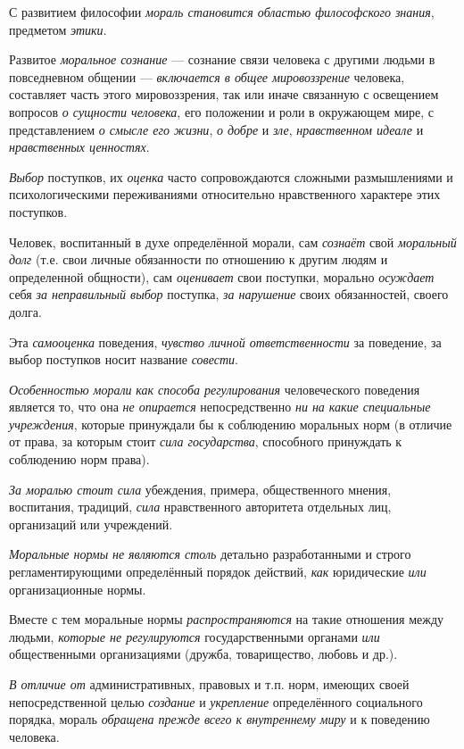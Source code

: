 \documentclass[a4paper,14pt,russian]{extreport}
\begin{document}
С развитием философии \emph{мораль становится областью философского знания}, предметом \emph{этики}.

Развитое \emph{моральное сознание} --- сознание связи человека с другими людьми в повседневном общении --- \emph{включается в общее мировоззрение} человека, составляет часть этого мировоззрения, так или иначе связанную с освещением вопросов \emph{о сущности человека}, его положении и роли в окружающем мире, с представлением \emph{о смысле его жизни}, \emph{о добре} и \emph{зле}, \emph{нравственном идеале} и \emph{нравственных ценностях}.

\emph{Выбор} поступков, их \emph{оценка} часто сопровождаются сложными размышлениями и психологическими переживаниями относительно нравственного характере этих поступков.

Человек, воспитанный в духе определённой морали, сам \emph{сознаёт} свой \emph{моральный долг} (т.е. свои личные обязанности по отношению к другим людям и определенной общности), сам \emph{оценивает} свои поступки, морально \emph{осуждает} себя \emph{за неправильный выбор} поступка, \emph{за нарушение} своих обязанностей, своего долга.

Эта \emph{самооценка} поведения, \emph{чувство личной ответственности} за поведение, за выбор поступков носит название \emph{совести}.

\emph{Особенностью морали} \emph{как способа регулирования} человеческого поведения является то, что она \emph{не опирается} непосредственно \emph{ни на какие специальные учреждения}, которые принуждали бы к соблюдению моральных норм (в отличие от права, за которым стоит \emph{сила государства}, способного принуждать к соблюдению норм права).

\emph{За моралью стоит сила} убеждения, примера, общественного мнения, воспитания, традиций, \emph{сила} нравственного авторитета отдельных лиц, организаций или учреждений.

\emph{Моральные нормы} \emph{не являются столь} детально разработанными и строго регламентирующими определённый порядок действий, \emph{как} юридические \emph{или} организационные нормы.

Вместе с тем моральные нормы \emph{распространяются} на такие отношения между людьми, \emph{которые не регулируются} государственными органами \emph{или} общественными организациями (дружба, товарищество, любовь и др.).

\emph{В отличие от} административных, правовых и т.п. норм, имеющих своей непосредственной целью \emph{создание} и \emph{укрепление} определённого социального порядка, мораль \emph{обращена прежде всего к внутреннему миру} и к поведению человека.
\end{document}
